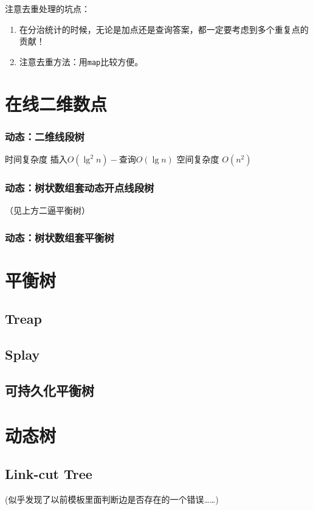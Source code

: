 \documentclass{article}
\begin{document}
			注意去重处理的坑点：
			\begin{enumerate}
				\item 在分治统计的时候，无论是加点还是查询答案，都一定要考虑到多个重复点的贡献！
				\item 注意去重方法：用\lstinline|map|比较方便。
			\end{enumerate}
			
	\section{在线二维数点}
		\subsubsection{动态：二维线段树}
		时间复杂度 $\text{插入} O(\lg^2 n) - \text{查询} O(\lg n)$
		空间复杂度 $O(n^2)$
		\subsubsection{动态：树状数组套动态开点线段树}
		（见上方二逼平衡树）
		\subsubsection{动态：树状数组套平衡树}
		
	\newpage

	\section{平衡树}
		\subsection{Treap}
		
		\subsection{Splay}
		
		\subsection{可持久化平衡树}
		

	\newpage

	\section{动态树}
		\subsection{Link-cut Tree}
		(似乎发现了以前模板里面判断边是否存在的一个错误……)
		
	\newpage
\end{document}
